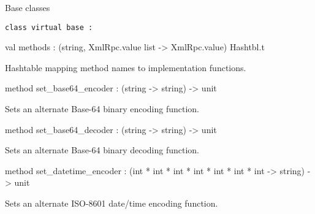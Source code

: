 \documentclass[11pt]{article}
\begin{document}
Base classes



\begin{ocamldoccode}
{\tt{class virtual base : }}\end{ocamldoccode}
\label{class:XmlRpcServer.base}

\begin{ocamldocobjectend}


\label{val:XmlRpcServer.base.methods}\begin{ocamldoccode}
val methods : (string, XmlRpc.value list -> XmlRpc.value) Hashtbl.t
\end{ocamldoccode}
\begin{ocamldocdescription}
Hashtable mapping method names to implementation functions.


\end{ocamldocdescription}


\label{method:XmlRpcServer.base.set-underscorebase64-underscoreencoder}\begin{ocamldoccode}
method set_base64_encoder : (string -> string) -> unit
\end{ocamldoccode}
\begin{ocamldocdescription}
Sets an alternate Base-64 binary encoding function.


\end{ocamldocdescription}


\label{method:XmlRpcServer.base.set-underscorebase64-underscoredecoder}\begin{ocamldoccode}
method set_base64_decoder : (string -> string) -> unit
\end{ocamldoccode}
\begin{ocamldocdescription}
Sets an alternate Base-64 binary decoding function.


\end{ocamldocdescription}


\label{method:XmlRpcServer.base.set-underscoredatetime-underscoreencoder}\begin{ocamldoccode}
method set_datetime_encoder :
  (int * int * int * int * int * int * int -> string) -> unit
\end{ocamldoccode}
\begin{ocamldocdescription}
Sets an alternate ISO-8601 date/time encoding function.



\end{ocamldocdescription}
\end{ocamldocobjectend}
\end{document}
